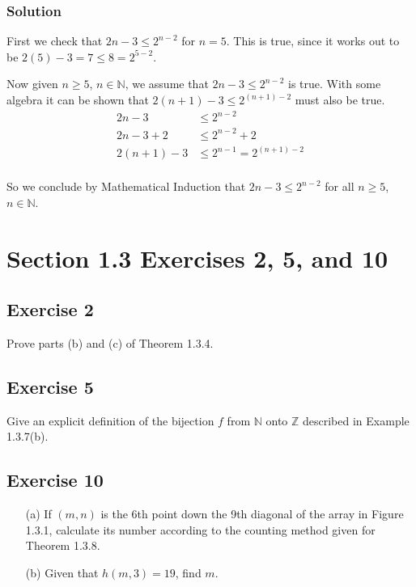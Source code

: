 \documentclass[12pt]{article}
\begin{document}
\subsubsection*{Solution}
First we check that $2n - 3 \leq 2^{n-2}$ for $n = 5$. This is true, since it works out to be $2(5) - 3 = 7 \leq 8 = 2^{5 - 2}$.

Now given $n \geq 5$, $n \in \mathbb{N}$, we assume that $2n - 3 \leq 2^{n-2}$ is true. With some algebra it can be shown that $2\left(n + 1\right) - 3 \leq 2^{\left(n + 1\right) - 2}$ must also be true.
\begin{align*}
2n - 3 &\leq 2^{n - 2} \\
2n - 3 + 2 &\leq 2^{n - 2} + 2 \\
2\left(n + 1\right) - 3 &\leq 2^{n - 1} = 2^{\left(n + 1\right) - 2} \\
\end{align*}

So we conclude by Mathematical Induction that $2n - 3 \leq 2^{n-2}$ for all $n \geq 5$, $n \in \mathbb{N}$.

\section*{Section 1.3 Exercises 2, 5, and 10}
\subsection*{Exercise 2}
Prove parts (b) and (c) of Theorem 1.3.4.
\subsection*{Exercise 5}
Give an explicit definition of the bijection $f$ from $\mathbb{N}$ onto $\mathbb{Z}$ described in Example 1.3.7(b).
\subsection*{Exercise 10}
\begin{itemize}
\item[(a)] If $\left(m, n\right)$ is the 6th point down the 9th diagonal of the array in Figure 1.3.1, calculate its number according to the counting method given for Theorem 1.3.8.
\item[(b)] Given that $h\left(m, 3\right) = 19$, find $m$.
\end{itemize}
\end{document}

